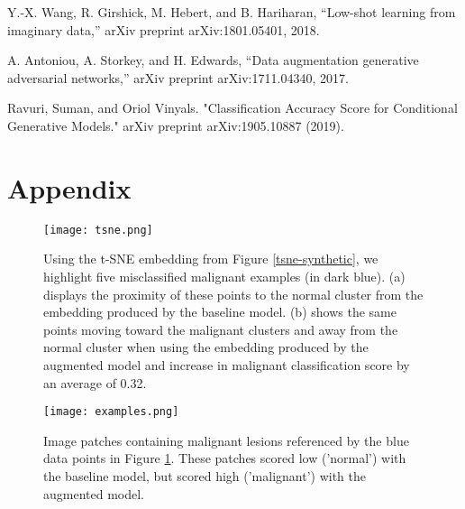 \documentclass{article}
\begin{document}
\begin{thebibliography}{}
Y.-X. Wang, R. Girshick, M. Hebert, and B. Hariharan, “Low-shot learning from
imaginary data,” arXiv preprint arXiv:1801.05401, 2018.

A. Antoniou, A. Storkey, and H. Edwards, “Data augmentation generative adversarial networks,” arXiv preprint arXiv:1711.04340, 2017.

Ravuri, Suman, and Oriol Vinyals. "Classification Accuracy Score for Conditional Generative Models." arXiv preprint arXiv:1905.10887 (2019).

\end{thebibliography}

\newpage
\section{Appendix}

\begin{figure}[b!]
\centering
\texttt{[image: tsne.png]}
\caption{Using the t-SNE embedding from Figure \ref{tsne-synthetic}, we highlight five misclassified malignant examples (in dark blue). (a) displays the proximity of these points to the normal cluster from the embedding produced by the baseline model. (b) shows the same points moving toward the malignant clusters and away from the normal cluster when using the embedding produced by the augmented model and increase in malignant classification score by an average of 0.32.}  \label{tsne}
\end{figure}

\begin{figure}
\centering
\texttt{[image: examples.png]}
\caption{Image patches containing malignant lesions referenced by the blue data points in Figure \ref{tsne}. These patches scored low ('normal') with the baseline model, but scored high ('malignant') with the augmented model.}  \label{examples}
\end{figure}
\end{document}

